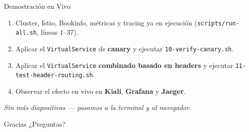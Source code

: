 \documentclass[aspectratio=169]{beamer}
\begin{document}
\begin{frame}{Demostración en Vivo}
  \begin{enumerate}
    \item Cluster, Istio, Bookinfo, métricas y tracing ya en ejecución
          (\texttt{scripts/run-all.sh}, líneas 1--37).
    \item Aplicar el \texttt{VirtualService} de \textbf{canary} y ejecutar
          \texttt{10-verify-canary.sh}.
    \item Aplicar el \texttt{VirtualService} \textbf{combinado basado en headers} y ejecutar
          \texttt{11-test-header-routing.sh}.
    \item Observar el efecto en vivo en \textbf{Kiali}, \textbf{Grafana} y \textbf{Jaeger}.
  \end{enumerate}
  \vspace{0.5cm}
  \centering
  \textit{Sin más diapositivas --- pasamos a la terminal y al navegador.}
\end{frame}

\begin{frame}{Gracias}
  \centering
  \Large ¿Preguntas?
\end{frame}
\end{document}
